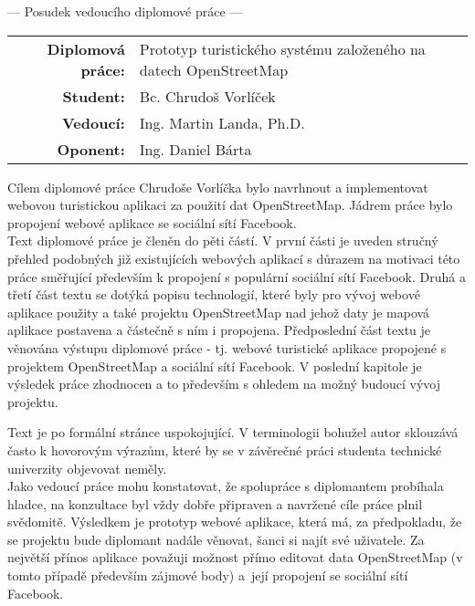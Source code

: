 \documentclass[czech,11pt,a4paper]{article}
\begin{document}
\begin{center}
  {\Large --- Posudek vedoucího diplomové práce ---}
\end{center}

\vspace{.5cm}

\noindent \begin{tabular}{rp{}}
  {\bf Diplomová práce:} & Prototyp turistického systému založeného na datech OpenStreetMap \\
  {\bf Student:} & Bc. Chrudoš Vorlíček \\
  {\bf Vedoucí:} & Ing. Martin Landa, Ph.D. \\
  {\bf Oponent:} & Ing. Daniel Bárta \\
\end{tabular}

\vspace{1cm}

Cílem diplomové práce Chrudoše Vorlíčka bylo navrhnout a implementovat
webovou turistickou aplikaci za použití dat OpenStreetMap. Jádrem
práce bylo propojení webové aplikace se sociální sítí Facebook.
\\

Text diplomové práce je členěn do pěti částí. V první části je uveden
stručný přehled podobných již existujících webových aplikací s důrazem
na motivaci této práce směřující především k propojení s populární
sociální sítí Facebook. Druhá a třetí část textu se dotýká popisu
technologií, které byly pro vývoj webové aplikace použity a také
projektu OpenStreetMap nad jehož daty je mapová aplikace postavena a
částečně s ním i propojena. Předposlední část textu je věnována
výstupu diplomové práce - tj. webové turistické aplikace propojené s
projektem OpenStreetMap a sociální sítí Facebook. V poslední kapitole
je výsledek práce zhodnocen a to především s ohledem na možný budoucí
vývoj projektu.

Text je po formální stránce uspokojující. V terminologii bohužel autor
sklouzává často k hovorovým výrazům, které by se v závěrečné práci
studenta technické univerzity objevovat neměly.
\\

Jako vedoucí práce mohu konstatovat, že spolupráce s diplomantem
probíhala hladce, na konzultace byl vždy dobře připraven a navržené
cíle práce plnil svědomitě. Výsledkem je prototyp webové aplikace,
která má, za předpokladu, že se projektu bude diplomant nadále
věnovat, šanci si najít své uživatele. Za největší přínos aplikace
považuji možnost přímo editovat data OpenStreetMap (v tomto případě
především zájmové body) a~její propojení se sociální sítí Facebook.
\\
\end{document}
